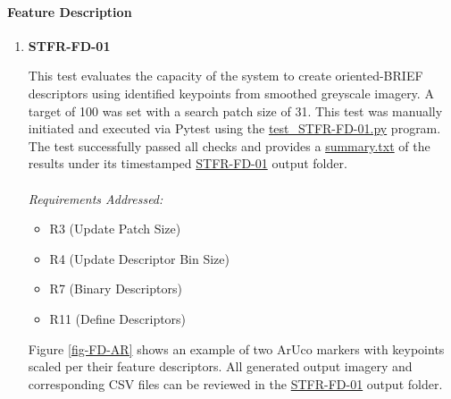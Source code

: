 \documentclass[12pt, titlepage]{article}
\begin{document}
\paragraph{Feature Description}
\begin{enumerate}
\item \hypertarget{STFR-FD-01}{\textbf{STFR-FD-01}\\}
This test evaluates the capacity of the system to create oriented-BRIEF descriptors using identified keypoints from smoothed greyscale imagery. A target of 100 was set with a search patch size of 31. This test was manually initiated and executed via Pytest using the \href{https://github.com/KiranSingh15/CAS-741-Image-Correspondences/blob/main/src/tests/test_STFR-FD-01.py}{test\_STFR-FD-01.py} program. The test successfully passed all checks and provides a \href{https://github.com/KiranSingh15/CAS-741-Image-Correspondences/blob/main/src/tests/Outputs/2025-04-13_12-17-18/summary.txt}{summary.txt} of the results under its timestamped \href{https://github.com/KiranSingh15/CAS-741-Image-Correspondences/tree/main/src/tests/Outputs/2025-04-13_12-17-18}{STFR-FD-01} output folder. \\ \\
\textit{Requirements Addressed:} 
\begin{itemize}
\item R3 (Update Patch Size)
\item R4 (Update Descriptor Bin Size)
\item R7 (Binary Descriptors)
\item R11 (Define Descriptors)
\end{itemize}

Figure \ref{fig-FD-AR} shows an example of two ArUco markers with keypoints scaled per their feature descriptors. All generated output imagery and corresponding CSV files can be reviewed in the \href{https://github.com/KiranSingh15/CAS-741-Image-Correspondences/tree/main/src/tests/Outputs/2025-04-13_12-17-18}{STFR-FD-01} output folder.\\



\end{enumerate}
\end{document}
